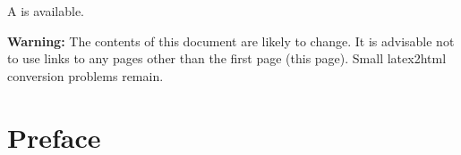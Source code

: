 

\setlength{\parindent}{0pt}
\setlength{\parskip}{2.5mm}

\maketitle

\begin{htmlonly}
A 
is available. 

{\bf Warning:} The contents of this document are likely to change.
It is advisable not to use links to any pages other than the first
page (this page). Small latex2html conversion problems remain.
\end{htmlonly}

%
%
%


\pagestyle{empty}

\newpage

\pagestyle{headings}
\tableofcontents
{}
\listoftables
{}
\listoffigures
{}

\chapter*{Preface}

